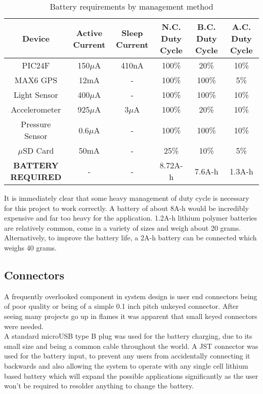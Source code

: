 \documentclass[12pt,openany,a4paper]{book}
\begin{document}
		\begin{table}[H]
			\centering
			\begin{adjustbox}{max width=\textwidth}
				\begin{tabular}{c | c | c | c | c | c }
					Device & Active Current & Sleep Current & N.C. Duty Cycle & B.C. Duty Cycle & A.C. Duty Cycle\\
					\hline
					PIC24F          & 150$\mu$A & 410nA  & 100\% & 20\%  & 10\%  \\
					MAX6 GPS        & 12mA      & -      & 100\% & 100\% & 5\%   \\
					Light Sensor    & 400$\mu$A & -      & 100\% & 100\% & 10\%  \\
					Accelerometer   & 925$\mu$A & 3$\mu$A& 100\% & 20\%  & 10\%  \\
					Pressure Sensor & 0.6$\mu$A & -      & 100\% & 100\% & 10\%  \\
					$\mu$SD Card    & 50mA      & -      & 25\%  & 10\%  & 5\%   \\
					\hline
					\bf BATTERY REQUIRED & - & - & 8.72A-h & 7.6A-h & 1.3A-h\\
				\end{tabular}
			\end{adjustbox}
			\caption{Battery requirements by management method}
			\label{tab:PWR}
		\end{table}		
		
		It is immediately clear that some heavy management of duty cycle is necessary for this project to work correctly. A battery of about 8A-h would be incredibly expensive and far too heavy for the application. 1.2A-h lithium polymer batteries are relatively common, come in a variety of sizes and weigh about 20 grams. Alternatively, to improve the battery life, a 2A-h battery can be connected which weighs 40 grams.
		
		\subsection{Connectors}
		A frequently overlooked component in system design is user end connectors being of poor quality or being of a simple 0.1 inch pitch unkeyed connector. After seeing many projects go up in flames it was apparent that small keyed connectors were needed. \\
		
		A standard microUSB type B plug was used for the battery charging, due to its small size and being a common cable throughout the world. A JST connector was used for the battery input, to prevent any users from accidentally connecting it backwards and also allowing the system to operate with any single cell lithium based battery which will expand the possible applications significantly as the user won't be required to resolder anything to change the battery. 
	\newpage
\end{document}
